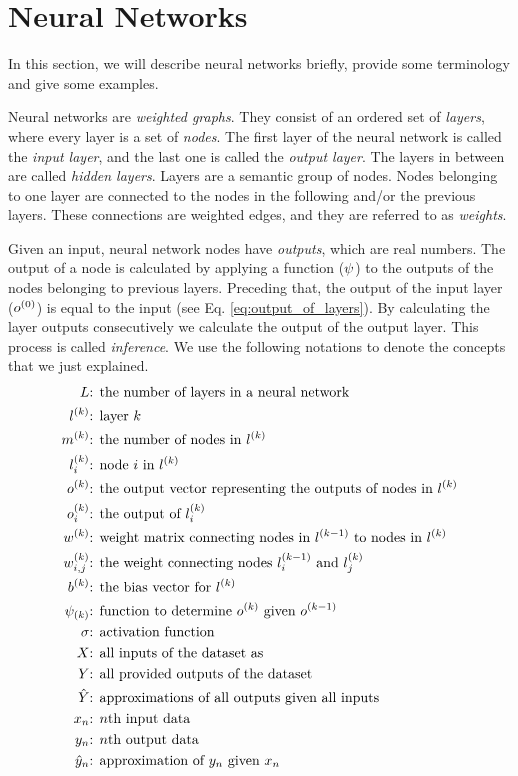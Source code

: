 \section{Neural Networks}
In this section, we will describe neural networks briefly, provide some terminology and give some examples. 

Neural networks are \textit{weighted graphs}. They consist of an ordered set of \textit{layers}, where every layer is a set of \textit{nodes}. The first layer of the neural network is called the \textit{input layer}, and the last one is called the \textit{output layer}. The layers in between are called \textit{hidden layers}. Layers are a semantic group of nodes. Nodes belonging to one layer are connected to the nodes in the following and/or the previous layers. These connections are weighted edges, and they are referred to as \textit{weights}. 

Given an input, neural network nodes have \textit{outputs}, which are real numbers. The output of a node is calculated by applying a function ($\psi$) to the outputs of the nodes belonging to previous layers. Preceding that, the output of the input layer ($o^{(0)}$) is equal to the input (see Eq. \ref{eq:output_of_layers}).  By calculating the layer outputs consecutively we calculate the output of the output layer. This process is called \textit{inference}. We use the following notations to denote the concepts that we just explained.
\begin{equation*}
\begin{split}
\num\layer & \text{: the number of layers in a neural network}\\
\lk{k} & \text{: layer $k$}\\
\mk{k} & \text{: the number of nodes in $\lk{k}$}\\
\lki{k}{i}  & \text{: node $i$ in $\lk{k}$}\\
\ok{k}  & \text{: the output vector representing the outputs of nodes in $\lk{k}$}\\
\oki{k}{i}  & \text{: the output of $\lki{k}{i}$}\\
\wk{k}  & \text{: weight matrix connecting nodes in $\lk{k-1}$ to nodes in $\lk{k}$} \\
\wki{k}{i,j}  & \text{: the weight connecting nodes $\lki{k-1}{i}$ and $\lki{k}{j}$} \\
\bk{k}  & \text{: the bias vector for $\lk{k}$} \\
\lfk{k} & \text{: function to determine $\ok{k}$ given $\ok{k-1}$}\\
\act & \text{: activation function} \\
\all\x & \text{: all inputs of the dataset as}\\
\all\y & \text{: all provided outputs of the dataset} \\
\all\yh & \text{: approximations of all outputs given all inputs}  \\
\xn{n} & \text{: $n$th input data} \\
\yn{n} & \text{: $n$th output data} \\
\yhn{n} & \text{: approximation of $\yn{n}$ given $\xn{n}$}
\end{split}
\end{equation*}

